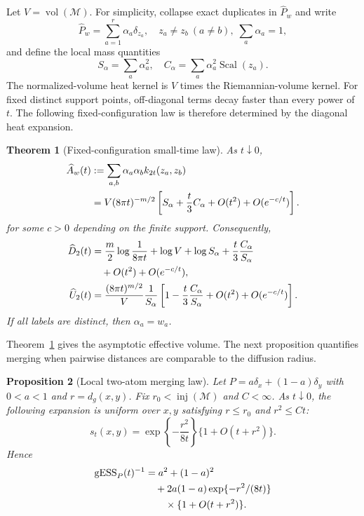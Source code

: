 \documentclass[twoside]{article}
\newtheorem{theorem}{Theorem}
\newtheorem{proposition}[theorem]{Proposition}
\theoremstyle{definition}
\theoremstyle{remark}
\DeclareMathOperator{\vol}{vol}
\DeclareMathOperator{\Scal}{Scal}
\newcommand{\M}{\mathcal{M}}
\newcommand{\gess}{\mathrm{gESS}}
\begin{document}
Let $V=\vol(\M)$. For simplicity, collapse exact duplicates in $\widehat P_w$ and write
\begin{equation*}
  \widehat P_w=\sum_{a=1}^r\alpha_a\delta_{z_a},
  \quad z_a\ne z_b\ (a\ne b),\; \sum_a\alpha_a=1,
\end{equation*}
and define the local mass quantities
\begin{equation*}
  S_\alpha=\sum_a\alpha_a^2,
  \quad
  C_\alpha=\sum_a\alpha_a^2 \Scal(z_a).
\end{equation*}
The normalized-volume heat kernel is $V$ times the Riemannian-volume kernel. For fixed distinct support points, off-diagonal terms decay faster than every power of $t$. The following fixed-configuration law is therefore determined by the diagonal heat expansion.

\begin{theorem}[Fixed-configuration small-time law]
\label{thm:small_time}
As $t\downarrow0$,
\begin{align}
  \widehat A_w(t)
  &:=\sum_{a,b}\alpha_a\alpha_b k_{2t}(z_a,z_b) \notag\\
  &=V(8\pi t)^{-m/2}
  \left[S_\alpha+\frac{t}{3}C_\alpha+O(t^2)+O(e^{-c/t})\right].
  \label{eq:small_time_expansion}
\end{align}
for some $c>0$ depending on the finite support. Consequently,
\begin{align*}
  \widehat D_2(t)
  &=\frac{m}{2}\log\frac{1}{8\pi t}+\log V+\log S_\alpha
    +\frac{t}{3}\frac{C_\alpha}{S_\alpha} \notag\\
  &\quad+O(t^2)+O(e^{-c/t}),\\
  \widehat U_2(t)
  &=\frac{(8\pi t)^{m/2}}{V}\frac{1}{S_\alpha}
    \left[1-\frac{t}{3}\frac{C_\alpha}{S_\alpha}+O(t^2)+O(e^{-c/t})\right].
\end{align*}
If all labels are distinct, then $\alpha_a=w_a$.
\end{theorem}

Theorem~\ref{thm:small_time} gives the asymptotic effective volume. The next proposition quantifies merging when pairwise distances are comparable to the diffusion radius.

\begin{proposition}[Local two-atom merging law]
\label{prop:merging}
Let $P=a\delta_x+(1-a)\delta_y$ with $0<a<1$ and $r=d_g(x,y)$. Fix $r_0<\operatorname{inj}(\M)$ and $C<\infty$. As $t\downarrow0$, the following expansion is uniform over $x,y$ satisfying $r\le r_0$ and $r^2\le Ct$:
\begin{equation}
  s_t(x,y)=\exp\left\{-\frac{r^2}{8t}\right\}\{1+O(t+r^2)\}.
  \label{eq:local_overlap}
\end{equation}
Hence
\begin{align}
  \gess_P(t)^{-1}
  &=a^2+(1-a)^2 \notag\\
  &\quad+2a(1-a)\exp\{-r^2/(8t)\}\notag\\
  &\qquad\times\{1+O(t+r^2)\}.
  \label{eq:two_atom_gess}
\end{align}
\end{proposition}
\end{document}
